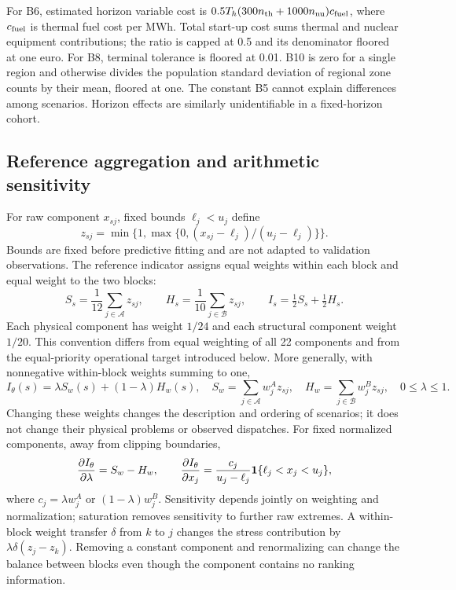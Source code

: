 For B6, estimated horizon variable cost is
$0.5T_h(300n_{\rm th}+1000n_{\rm nu})c_{\rm fuel}$, where $c_{\rm fuel}$
is thermal fuel cost per MWh. Total start-up cost sums thermal and nuclear
equipment contributions; the ratio is capped at 0.5 and its denominator
floored at one euro. For B8, terminal tolerance is floored at 0.01. B10 is
zero for a single region and otherwise divides the population standard
deviation of regional zone counts by their mean, floored at one. The
constant B5 cannot explain differences among scenarios. Horizon effects
are similarly unidentifiable in a fixed-horizon cohort.

\subsection{Reference aggregation and arithmetic sensitivity}
\label{sec:score_sensitivity}
For raw component $x_{sj}$, fixed bounds $\ell_j<u_j$ define
\begin{equation}
 z_{sj}=\min\{1,\max\{0,(x_{sj}-\ell_j)/(u_j-\ell_j)\}\}.
 \label{eq:normalization}
\end{equation}
Bounds are fixed before predictive fitting and are not adapted to validation
observations. The reference indicator assigns equal weights within each
block and equal weight to the two blocks:
\begin{equation}
 S_s=\frac1{12}\sum_{j\in\mathcal A}z_{sj},\qquad
 H_s=\frac1{10}\sum_{j\in\mathcal B}z_{sj},\qquad
 I_s=\tfrac12 S_s+\tfrac12 H_s.
 \label{eq:reference_index}
\end{equation}
Each physical component has weight $1/24$ and each structural component
weight $1/20$. This convention differs from equal weighting of all 22
components and from the equal-priority operational target introduced below.
More generally, with nonnegative within-block weights summing to one,
\begin{equation}
 I_\theta(s)=\lambda S_w(s)+(1-\lambda)H_w(s),\quad
 S_w=\sum_{j\in\mathcal A}w^A_jz_{sj},\quad
 H_w=\sum_{j\in\mathcal B}w^B_jz_{sj},\quad 0\leq\lambda\leq1.
 \label{eq:weighted_index}
\end{equation}
Changing these weights changes the description and ordering of scenarios;
it does not change their physical problems or observed dispatches. For
fixed normalized components, away from clipping boundaries,
\begin{equation}
 \frac{\partial I_\theta}{\partial\lambda}=S_w-H_w,\qquad
 \frac{\partial I_\theta}{\partial x_j}
 =\frac{c_j}{u_j-\ell_j}\mathbf{1}\{\ell_j<x_j<u_j\},
 \label{eq:raw_sensitivity}
\end{equation}
where $c_j=\lambda w_j^A$ or $(1-\lambda)w_j^B$. Sensitivity depends jointly
on weighting and normalization; saturation removes sensitivity to further
raw extremes. A within-block weight transfer $\delta$ from $k$ to $j$
changes the stress contribution by $\lambda\delta(z_j-z_k)$. Removing a
constant component and renormalizing can change the balance between blocks
even though the component contains no ranking information.

